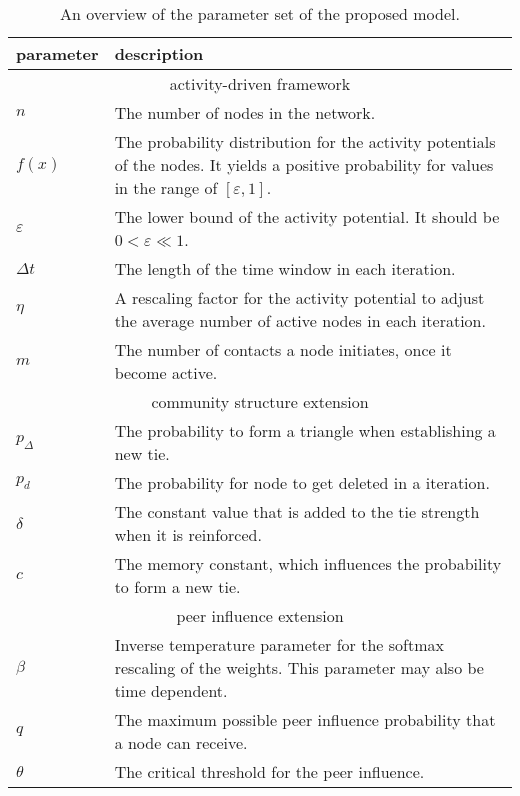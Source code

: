 \begin{table}
\centering
\begin{tabular}{lp{10cm}}
\toprule
\textbf{parameter} & \textbf{description} \\
\midrule
\multicolumn{2}{c}{activity-driven framework} \\
\midrule
\( n \) & The number of nodes in the network. \\
\( f(x) \) & The probability distribution for the activity potentials of the nodes. It yields a positive probability for values in the range of \( [\varepsilon, 1] \). \\
\( \varepsilon \) &  The lower bound of the activity potential. It should be \( 0 < \varepsilon \ll 1 \). \\
\( \Delta t \) &  The length of the time window in each iteration. \\
\( \eta \) &  A rescaling factor for the activity potential to adjust the average number of active nodes in each iteration. \\
\( m \) & The number of contacts a node initiates, once it become active. \\
\midrule
\multicolumn{2}{c}{community structure extension} \\
\midrule
\( p_{\Delta} \) & The probability to form a triangle when establishing a new tie. \\
\( p_{d} \) & The probability for node to get deleted in a iteration. \\
\( \delta \) & The constant value that is added to the tie strength when it is reinforced. \\
\( c \) &  The memory constant, which influences the probability to form a new tie.\\
\midrule
\multicolumn{2}{c}{peer influence extension} \\
\midrule
\( \beta \) & Inverse temperature parameter for the softmax rescaling of the weights. This parameter may also be time dependent. \\
\( q \) & The maximum possible peer influence probability that a node can receive. \\
\( \theta \) & The critical threshold for the peer influence. \\
\bottomrule
\end{tabular}

\caption[Overview proposed model parameter]{An overview of the parameter set of the proposed model.}
\label{tbl:all-model-parameter}
\end{table}
